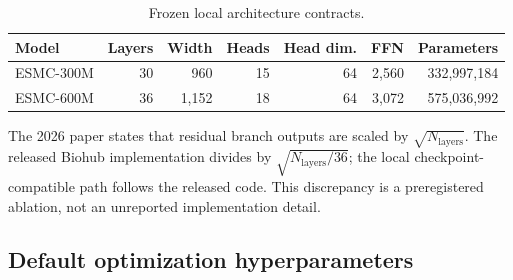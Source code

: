 \documentclass{article}
\begin{document}
\begin{table}[H]
  \centering
  \small
  \begin{tabular}{@{}lrrrrrr@{}}
    \toprule
    Model & Layers & Width & Heads & Head dim. & FFN & Parameters \\
    \midrule
    ESMC-300M & 30 & 960 & 15 & 64 & 2,560 & 332,997,184 \\
    ESMC-600M & 36 & 1,152 & 18 & 64 & 3,072 & 575,036,992 \\
    \bottomrule
  \end{tabular}
  \caption{Frozen local architecture contracts.}
  \label{tab:architecture}
\end{table}

The 2026 paper states that residual branch outputs are scaled by
$\sqrt{N_{\mathrm{layers}}}$. The released Biohub implementation divides by
$\sqrt{N_{\mathrm{layers}}/36}$; the local checkpoint-compatible path follows
the released code. This discrepancy is a preregistered ablation, not an
unreported implementation detail.

\subsection{Default optimization hyperparameters}
\end{document}

